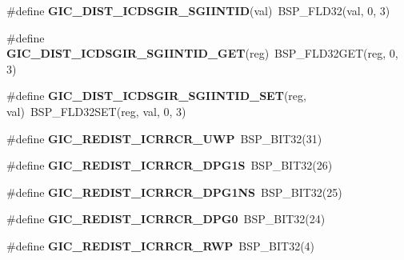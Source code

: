 \begin{DoxyCompactItemize}
\item 
\mbox{\label{arm-gic-regs_8h_af7d8d0d51000873944d2ffa1bc7e7751}} 
\#define {\bfseries G\+I\+C\+\_\+\+D\+I\+S\+T\+\_\+\+I\+C\+D\+S\+G\+I\+R\+\_\+\+S\+G\+I\+I\+N\+T\+ID}(val)~B\+S\+P\+\_\+\+F\+L\+D32(val, 0, 3)
\item 
\mbox{\label{arm-gic-regs_8h_a62f15df05fc7cf5f24bf051382afd379}} 
\#define {\bfseries G\+I\+C\+\_\+\+D\+I\+S\+T\+\_\+\+I\+C\+D\+S\+G\+I\+R\+\_\+\+S\+G\+I\+I\+N\+T\+I\+D\+\_\+\+G\+ET}(reg)~B\+S\+P\+\_\+\+F\+L\+D32\+G\+ET(reg, 0, 3)
\item 
\mbox{\label{arm-gic-regs_8h_afd5528c4ca239095ac9af546f2b1b2c5}} 
\#define {\bfseries G\+I\+C\+\_\+\+D\+I\+S\+T\+\_\+\+I\+C\+D\+S\+G\+I\+R\+\_\+\+S\+G\+I\+I\+N\+T\+I\+D\+\_\+\+S\+ET}(reg,  val)~B\+S\+P\+\_\+\+F\+L\+D32\+S\+ET(reg, val, 0, 3)
\item 
\mbox{\label{arm-gic-regs_8h_a8abfdd1a52aed67b57d563a44ca0398b}} 
\#define {\bfseries G\+I\+C\+\_\+\+R\+E\+D\+I\+S\+T\+\_\+\+I\+C\+R\+R\+C\+R\+\_\+\+U\+WP}~B\+S\+P\+\_\+\+B\+I\+T32(31)
\item 
\mbox{\label{arm-gic-regs_8h_a2ea8ed4d349fb13d0378357b4b6640fe}} 
\#define {\bfseries G\+I\+C\+\_\+\+R\+E\+D\+I\+S\+T\+\_\+\+I\+C\+R\+R\+C\+R\+\_\+\+D\+P\+G1S}~B\+S\+P\+\_\+\+B\+I\+T32(26)
\item 
\mbox{\label{arm-gic-regs_8h_a911d03df2565a82dd1c75592c2f80bb0}} 
\#define {\bfseries G\+I\+C\+\_\+\+R\+E\+D\+I\+S\+T\+\_\+\+I\+C\+R\+R\+C\+R\+\_\+\+D\+P\+G1\+NS}~B\+S\+P\+\_\+\+B\+I\+T32(25)
\item 
\mbox{\label{arm-gic-regs_8h_a6bb4827ed675e186c85c225be6fb1ad9}} 
\#define {\bfseries G\+I\+C\+\_\+\+R\+E\+D\+I\+S\+T\+\_\+\+I\+C\+R\+R\+C\+R\+\_\+\+D\+P\+G0}~B\+S\+P\+\_\+\+B\+I\+T32(24)
\item 
\mbox{\label{arm-gic-regs_8h_a3edc85ab6432215a0bfc3e64b92420d2}} 
\#define {\bfseries G\+I\+C\+\_\+\+R\+E\+D\+I\+S\+T\+\_\+\+I\+C\+R\+R\+C\+R\+\_\+\+R\+WP}~B\+S\+P\+\_\+\+B\+I\+T32(4)
\item 
\mbox{\label{arm-gic-regs_8h_a97030061064317edae1487d13f0ddd37}} 

\end{DoxyCompactItemize}
